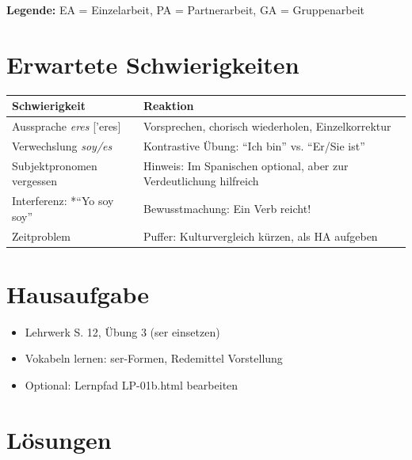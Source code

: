 \documentclass[11pt,a4paper]{article}
\begin{document}
\textbf{Legende:} EA = Einzelarbeit, PA = Partnerarbeit, GA = Gruppenarbeit

\section{Erwartete Schwierigkeiten}

\begin{tabular}{|p{4.5cm}|p{8cm}|}
\hline
\textbf{Schwierigkeit} & \textbf{Reaktion} \\
\hline
Aussprache \textit{eres} ['eres] & Vorsprechen, chorisch wiederholen, Einzelkorrektur \\
\hline
Verwechslung \textit{soy/es} & Kontrastive Übung: ``Ich bin'' vs. ``Er/Sie ist'' \\
\hline
Subjektpronomen vergessen & Hinweis: Im Spanischen optional, aber zur Verdeutlichung hilfreich \\
\hline
Interferenz: *``Yo soy soy'' & Bewusstmachung: Ein Verb reicht! \\
\hline
Zeitproblem & Puffer: Kulturvergleich kürzen, als HA aufgeben \\
\hline
\end{tabular}

\section{Hausaufgabe}

\begin{itemize}
    \item Lehrwerk S. 12, Übung 3 (ser einsetzen)
    \item Vokabeln lernen: ser-Formen, Redemittel Vorstellung
    \item Optional: Lernpfad LP-01b.html bearbeiten
\end{itemize}

\section{Lösungen}
\end{document}
